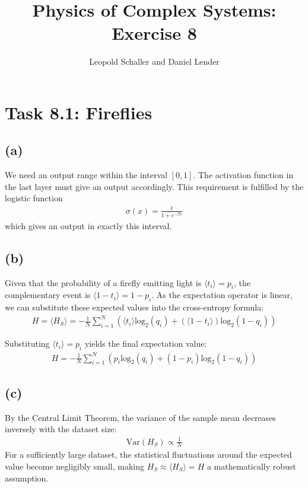 \documentclass{article}
\title{Physics of Complex Systems: Exercise 8}
\author{Leopold Schaller and Daniel Lender}
\begin{document}
\maketitle

\section*{Task 8.1: Fireflies}

    \subsection*{(a)}
    We need an output range within the interval $[0,1]$.
    The activation function in the last layer must give an output accordingly. This requirement is fulfilled by the logistic function 
    \begin{align}
        \sigma(x) = \frac{1}{1 + e^{-\beta x}}
    \end{align}
    which gives an output in exactly this interval.

    \subsection*{(b)}
    Given that the probability of a firefly emitting light is $\langle t_i\rangle=p_i$, the complementary event is $\langle1- t_i\rangle=1-p_i$. As the expectation operator is linear, we can substitute these expected values into the cross-entropy formula:
    \begin{align}
    H= \langle H_S \rangle= - \frac{1}{N}\sum^N_{i=1}\left(\langle t_i\rangle \text{log}_2(q_i)+(\langle 1 - t_i\rangle)\text{log}_2(1 - q_i)\right)
    \end{align}
    
    Substituting $\langle t_i\rangle=p_i$ yields the final expectation value:
    \begin{align}
        H = - \frac{1}{N}\sum^N_{i=1}(p_i\text{log}_2(q_i)+(1 - p_i)\text{log}_2(1 - q_i))
    \end{align}

    \subsection*{(c)}
    By the Central Limit Theorem, the variance of the sample mean decreases inversely with the dataset size:\begin{align}
        \text{Var}(H_S) \propto \frac{1}{N}
    \end{align}
    For a sufficiently large dataset, the statistical fluctuations around the expected value become negligibly small, making $H_S \approx \langle H_S \rangle = H$ a mathematically robust assumption.
\end{document}
